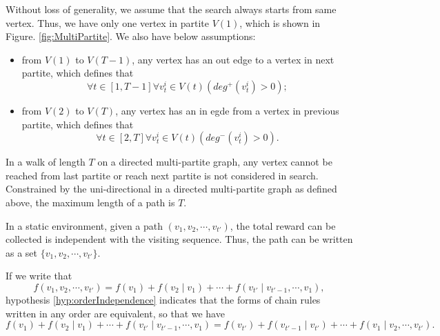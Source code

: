 \documentclass[12pt]{article}
\begin{document}
Without loss of generality, we assume that the search always starts from same vertex.
Thus, we have only one vertex in partite $ V(1) $, which is shown in Figure. \ref{fig:MultiPartite}.
We also have below assumptions:
\begin{itemize}
\item from $ V(1) $ to $ V(T-1) $, any vertex has an out edge to a vertex in next partite, which defines that 
\begin{equation}
\forall t \in [1, T-1] \forall v^{i}_{t} \in V(t)  \left( deg^{+}(v^{i}_{t}) > 0 \right) ;
\end{equation}
\item from $ V(2) $ to $ V(T) $, any vertex has an in egde from a vertex in previous partite, which defines that
\begin{equation}
\forall t \in [2, T] \forall v^{i}_{t} \in V(t)  \left( deg^{-}(v^{i}_{t}) > 0 \right).
\end{equation}
\end{itemize}

In a walk of length $ T $  on a directed multi-partite graph, any vertex cannot be reached from last partite or reach next partite is not considered in search.
Constrained by the uni-directional in a directed multi-partite graph as defined above, the maximum length of a path is $ T $.

\begin{hyp}
\label{hyp:orderIndependence}
In a static environment, given a path $ ( v_{1}, v_{2} , \cdots , v_{t'} ) $, the total reward can be collected is independent with the visiting sequence.
Thus, the path can be written as a set $ \{ v_{1}, v_{2} , \cdots , v_{t'} \}  $.
\end{hyp}

If we write that
\begin{equation}
\label{eq:chain_rule}
f( v_{1}, v_{2} , \cdots , v_{t'} )  = f( v_{1} ) + f( v_{2} \mid v_{1} ) + \cdots + f( v_{t'} \mid v_{t'-1}, \cdots , v_{1} ),
\end{equation}
hypothesis \ref{hyp:orderIndependence} indicates that the forms of chain rules written in any order are equivalent,
so that we have
\begin{equation}
\label{eq:chain_rule_equival}
f( v_{1} ) + f( v_{2} \mid v_{1} ) + \cdots + f( v_{t'} \mid v_{t'-1}, \cdots , v_{1} ) = 
f( v_{t'} ) + f( v_{t'-1} \mid v_{t'} ) + \cdots + f( v_{1} \mid v_{2}, \cdots , v_{t'} ).
\end{equation}
\end{document}
